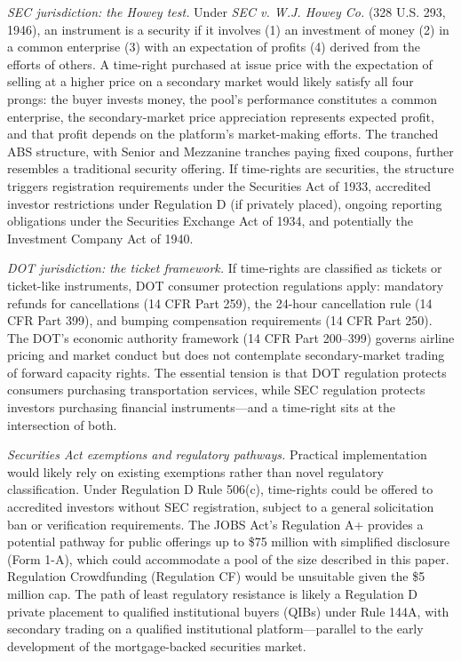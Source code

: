\documentclass[12pt,a4paper]{article}
\begin{document}
\textit{SEC jurisdiction: the Howey test.} Under \textit{SEC v. W.J. Howey Co.} (328 U.S. 293, 1946), an instrument is a security if it involves (1) an investment of money (2) in a common enterprise (3) with an expectation of profits (4) derived from the efforts of others. A time-right purchased at issue price with the expectation of selling at a higher price on a secondary market would likely satisfy all four prongs: the buyer invests money, the pool's performance constitutes a common enterprise, the secondary-market price appreciation represents expected profit, and that profit depends on the platform's market-making efforts. The tranched ABS structure, with Senior and Mezzanine tranches paying fixed coupons, further resembles a traditional security offering. If time-rights are securities, the structure triggers registration requirements under the Securities Act of 1933, accredited investor restrictions under Regulation D (if privately placed), ongoing reporting obligations under the Securities Exchange Act of 1934, and potentially the Investment Company Act of 1940.

\textit{DOT jurisdiction: the ticket framework.} If time-rights are classified as tickets or ticket-like instruments, DOT consumer protection regulations apply: mandatory refunds for cancellations (14 CFR Part 259), the 24-hour cancellation rule (14 CFR Part 399), and bumping compensation requirements (14 CFR Part 250). The DOT's economic authority framework (14 CFR Part 200--399) governs airline pricing and market conduct but does not contemplate secondary-market trading of forward capacity rights. The essential tension is that DOT regulation protects consumers purchasing transportation services, while SEC regulation protects investors purchasing financial instruments---and a time-right sits at the intersection of both.

\textit{Securities Act exemptions and regulatory pathways.} Practical implementation would likely rely on existing exemptions rather than novel regulatory classification. Under Regulation D Rule 506(c), time-rights could be offered to accredited investors without SEC registration, subject to a general solicitation ban or verification requirements. The JOBS Act's Regulation A+ provides a potential pathway for public offerings up to \$75 million with simplified disclosure (Form 1-A), which could accommodate a pool of the size described in this paper. Regulation Crowdfunding (Regulation CF) would be unsuitable given the \$5 million cap. The path of least regulatory resistance is likely a Regulation D private placement to qualified institutional buyers (QIBs) under Rule 144A, with secondary trading on a qualified institutional platform---parallel to the early development of the mortgage-backed securities market.
\end{document}
